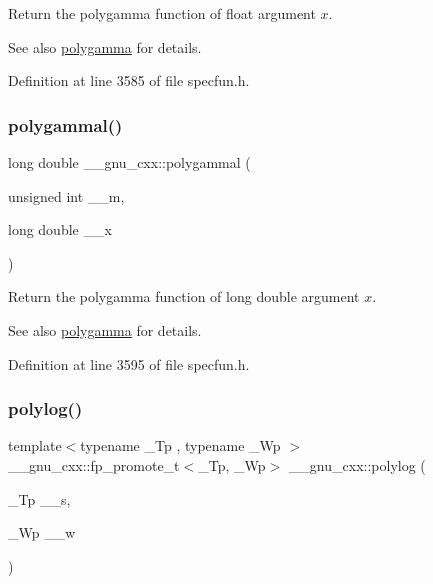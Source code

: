 Return the polygamma function of {\ttfamily float} argument $ x $.

\begin{DoxySeeAlso}{See also}
\hyperlink{group__gnu__math__spec__func_ga65e674e7fe1457e819897e0d608c18b8}{polygamma} for details. 
\end{DoxySeeAlso}


Definition at line 3585 of file specfun.\+h.

\mbox{\label{group__gnu__math__spec__func_gaa6a37359a97ba43f32aa842705c416d4}} 
\subsubsection{\texorpdfstring{polygammal()}{polygammal()}}
{\footnotesize\ttfamily long double \+\_\+\+\_\+gnu\+\_\+cxx\+::polygammal (\begin{DoxyParamCaption}\item[{unsigned int}]{\+\_\+\+\_\+m,  }\item[{long double}]{\+\_\+\+\_\+x }\end{DoxyParamCaption})\hspace{0.3cm}{\ttfamily [inline]}}

Return the polygamma function of {\ttfamily long double} argument $ x $.

\begin{DoxySeeAlso}{See also}
\hyperlink{group__gnu__math__spec__func_ga65e674e7fe1457e819897e0d608c18b8}{polygamma} for details. 
\end{DoxySeeAlso}


Definition at line 3595 of file specfun.\+h.

\mbox{\label{group__gnu__math__spec__func_gabcc5480ad739561c2debd6a8a352084f}} 
\subsubsection{\texorpdfstring{polylog()}{polylog()}\hspace{0.1cm}{\footnotesize\ttfamily [1/2]}}
{\footnotesize\ttfamily template$<$typename \+\_\+\+Tp , typename \+\_\+\+Wp $>$ \\
\+\_\+\+\_\+gnu\+\_\+cxx\+::fp\+\_\+promote\+\_\+t$<$\+\_\+\+Tp, \+\_\+\+Wp$>$ \+\_\+\+\_\+gnu\+\_\+cxx\+::polylog (\begin{DoxyParamCaption}\item[{\+\_\+\+Tp}]{\+\_\+\+\_\+s,  }\item[{\+\_\+\+Wp}]{\+\_\+\+\_\+w }\end{DoxyParamCaption})\hspace{0.3cm}{\ttfamily [inline]}}

